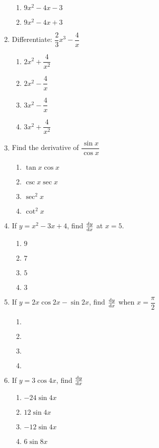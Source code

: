 \begin{multicols}{2}
\begin{enumerate}[label={\arabic*.}]
\begin{enumerate}[label={\Alph*.}]
		\item \(9{x}^{2} - 4x - 3\)
		\item \(9{x}^{2} - 4x + 3\)
	\end{enumerate}
\item Differentiate: \(\dfrac{2}{3}x^{3}-\dfrac{4}{x}\)
	\begin{enumerate}[label={\Alph*.}]
		\item \(2{x}^{2} + \dfrac{4}{{x}^{2}}\)
		\item \(2x^{2}-\dfrac{4}{x}\)
		\item \(3x^{2}-\dfrac{4}{x}\)
		\item \(3x^{2}+\dfrac{4}{{x}^{2}}\)
	\end{enumerate}
\item Find the derivative of \(\dfrac{\sin {x}}{\cos {x}}\)
	\begin{enumerate}[label={\Alph*.}]
		\item \(\tan{x}\cos{x}\)
		\item \(\csc{x}\sec{x}\)
		\item \(\sec^{2}{x}\)
		\item \(\cot^{2}{x}\)
	\end{enumerate}
\item If \(y = {x}^{2}-3x+4\), find \(\dv{y}{x}\) at \(x=5\).
	\begin{enumerate}[label={\Alph*.}]
		\item \(9\)
		\item \(7\)
		\item \(5\)
		\item \(3\)
	\end{enumerate}
\item If \(y = 2x\cos{2x}-\sin{2x}\), find \(\dv{y}{x}\) when \(x=\dfrac{\pi}{2}\)
	\begin{enumerate}[label={\Alph*.}]
		\item \(\)
		\item \(\)
		\item \(\)
		\item \(\)
	\end{enumerate}
\item If \(y=3\cos{4x}\), find \(\dv{y}{x}\)
\begin{enumerate}[label={\Alph*.}]
\item \(-24\sin{4x}\)
\item \(12\sin{4x}\)
\item \(-12 \sin{4x}\)
\item \(6\sin{8x}\)
\end{enumerate}

\end{enumerate}
\end{multicols}
